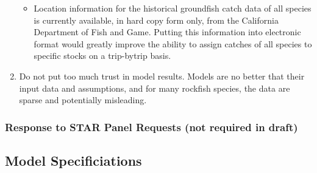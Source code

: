 \documentclass[11pt,
  english,
  a4paper,
]{article}
\begin{document}
\begin{enumerate}
\begin{itemize}
    \tagmcend\tagstructend\tagstructend

    \tagmcend\tagstructend\tagstructend
  \item


    Location information for the historical groundfish catch data of all species is currently available, in hard copy form only, from the California Department of Fish and Game. Putting this information into electronic format would greatly improve the ability to assign catches of all species to specific stocks on a trip-bytrip basis.\\

    \tagmcend\tagstructend\tagstructend

    \tagmcend\tagstructend\tagstructend
  \end{itemize}

  \tagstructend
\item

  Do not put too much trust in model results. Models are no better that their input data and assumptions, and for many rockfish species, the data are sparse and potentially misleading.

  \tagmcend\tagstructend\tagstructend
\end{enumerate}

\tagstructend


\hypertarget{response-to-star-panel-requests-not-required-in-draft}{%
\subsubsection{Response to STAR Panel Requests (not required in draft)}\label{response-to-star-panel-requests-not-required-in-draft}}

\leavevmode\tagmcend\tagstructend


\hypertarget{model-specificiations}{%
\subsection{Model Specificiations}\label{model-specificiations}}

\leavevmode\tagmcend\tagstructend
\end{document}
